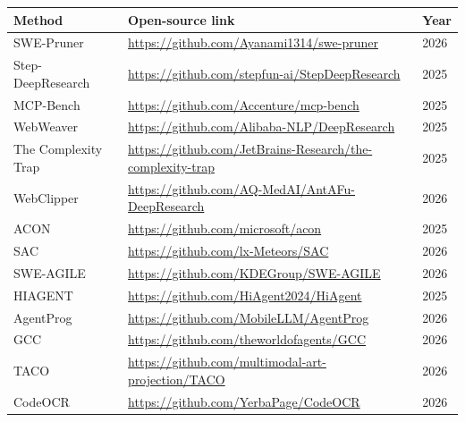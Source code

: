 \begin{table}[htbp]
\centering
\footnotesize
\setlength{\tabcolsep}{5pt}
\renewcommand{\arraystretch}{1.12}
\begin{tabular}{p{}p{}p{}}
\toprule[1.5pt]
\textbf{Method} & \textbf{Open-source link} & \textbf{Year} \\
\midrule
SWE-Pruner~\citep{wang2026sweprunerselfadaptivecontextpruning} & \url{https://github.com/Ayanami1314/swe-pruner} & 2026 \\
Step-DeepResearch~\citep{hu2025stepdeepresearchtechnicalreport} & \url{https://github.com/stepfun-ai/StepDeepResearch} & 2025 \\
MCP-Bench~\citep{wang2025mcpbenchbenchmarkingtoolusingllm} & \url{https://github.com/Accenture/mcp-bench} & 2025 \\
WebWeaver~\citep{li2025webweaverstructuringwebscaleevidence} & \url{https://github.com/Alibaba-NLP/DeepResearch} & 2025 \\
The Complexity Trap~\citep{lindenbauer2025complexitytrapsimpleobservation} & \url{https://github.com/JetBrains-Research/the-complexity-trap} & 2025 \\
WebClipper~\citep{wang2026webclipperefficientevolutionweb} & \url{https://github.com/AQ-MedAI/AntAFu-DeepResearch} & 2026 \\
ACON~\citep{kang2025aconoptimizingcontextcompression} & \url{https://github.com/microsoft/acon} & 2025 \\
SAC~\citep{liu2026autoencodingfreecontextcompressionllms} & \url{https://github.com/lx-Meteors/SAC} & 2026 \\
SWE-AGILE~\citep{lian2026sweagilesoftwareagentframework} & \url{https://github.com/KDEGroup/SWE-AGILE} & 2026 \\
HIAGENT~\citep{hu-etal-2025-hiagent} & \url{https://github.com/HiAgent2024/HiAgent} & 2025 \\
AgentProg~\citep{tian2026agentprogempoweringlonghorizongui} & \url{https://github.com/MobileLLM/AgentProg} & 2026 \\
GCC~\citep{wu2026gitcontextcontrollermanage} & \url{https://github.com/theworldofagents/GCC} & 2026 \\
TACO~\citep{ren2026selfevolvingframeworkefficientterminal} & \url{https://github.com/multimodal-art-projection/TACO} & 2026 \\
CodeOCR~\citep{shi2026codeocr} & \url{https://github.com/YerbaPage/CodeOCR} & 2026 \\

\end{tabular}
\end{table}
